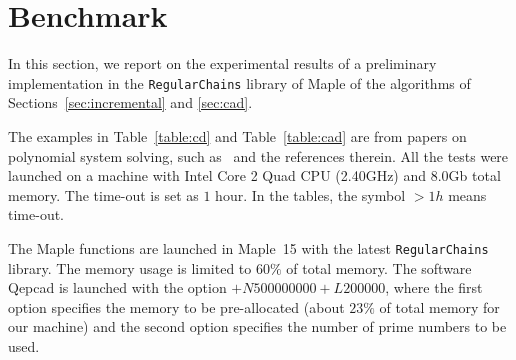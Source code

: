 \documentclass[10pt]{article}
\newcommand{\Maple}{{\sc  Maple}}
\newcommand{\RegularChains}{{\tt  Regu\-lar\-Chains}}
\newcommand{\QEPCAD}{{\sc Qepcad}}
\begin{document}
\section{Benchmark}
\label{sec:benchmark}
In this section, we report on the experimental results 
of a preliminary implementation 
in the {\RegularChains} 
library of {\Maple} of the algorithms of Sections~\ref{sec:incremental}
and \ref{sec:cad}.

The examples in Table~\ref{table:cd} and Table~\ref{table:cad}
are from papers on polynomial system solving,
such as~\cite{CGLMP07,BoulierChenLemaireMorenoMaza09}
and the references therein.
All the tests were launched
on a machine with Intel Core 2 Quad {\small CPU} (2.40{\small GHz}) 
and 8.0{\small Gb} total memory.
The time-out is set as $1$ hour.
In the tables, the symbol $> 1h$ means time-out.

The {\Maple} functions are launched in {\Maple}~15
with the latest {\RegularChains} library.
The memory usage is limited to $60\%$ of total memory.
The software {\QEPCAD} is launched with the option $+N500000000 +L200000$, 
where the first option specifies the memory to be pre-allocated 
(about $23\%$ of total memory for our machine)
and the second option specifies the number of prime numbers to be used.
\end{document}

